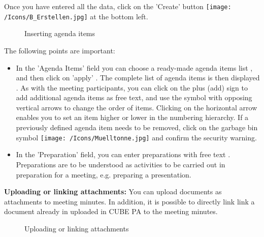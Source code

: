 Once you have entered all the data, click on the 'Create' button \texttt{[image: /Icons/B\_Erstellen.jpg]} at the bottom left.

\begin{figure}[H]
\caption{Inserting agenda items}
\end{figure}

The following points are important:

\begin{itemize}
\item 
In the 'Agenda Items' field you can choose a ready-made agenda items list , and then click on 'apply' . The complete list of agenda items is then displayed . As with the meeting participants, you can click on the plus (add) sign  to add additional agenda items as free text, and use the symbol with opposing vertical arrows  to change the order of items. Clicking on the horizontal arrow  enables you to set an item higher or lower in the numbering hierarchy. If a previously defined agenda item needs to be removed, click on the garbage bin symbol \texttt{[image: /Icons/Muelltonne.jpg]}  and confirm the security warning.
\item 
In the 'Preparation' field, you can enter preparations with free text . Preparations are to be understood as activities to be carried out in preparation for a meeting, e.g. preparing a presentation.
\end{itemize}

\textbf{Uploading or linking attachments:}
You can upload documents as attachments to meeting minutes. In addition, it is possible to directly link link a document already in uploaded in CUBE PA to the meeting minutes.  

\vspace{\baselineskip}

\begin{figure}[H]
\caption{Uploading or linking attachments}
\end{figure}

